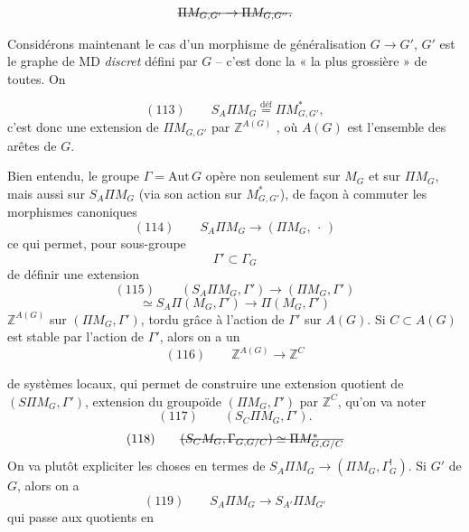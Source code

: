 \documentclass[11pt,a4paper]{article}
\begin{document}
   
\[
\text{\struck{$\Pi M_{G,G'} \to \Pi M_{G,G''}$.}}
\]

Considérons maintenant le cas d'un morphisme de généralisation $G \to G'$,  $G'$ est le graphe de MD \emph{discret} défini par $G$ -- c'est donc la   « la plus grossière » de toutes. On  


\[
(113)\qquad S_{A}\Pi M_{G} \overset{\mathrm{déf}}{=} \Pi M^{*}_{G,G'} ,
\]
\marginal{\struck{\ill{}} $= \surd$}
c'est donc une extension de $\Pi M_{G,G'}$ par $\mathbb{Z}^{A(G)}$ \struck{\ill{}}, où $A(G)$ est l'ensemble des arêtes de $G$.

Bien entendu, le groupe $\Gamma = \mathrm{Aut}\, G$ opère non seulement sur $M_{G}$ et sur $\Pi M_{G}$, mais aussi sur $S_{A}\Pi M_{G}$ \struck{\ill{}} (via son action sur $M^{*}_{G,G'}$), de façon à commuter  les morphismes canoniques
\[
(114)\qquad S_{A}\Pi M_{G} \longrightarrow (\Pi M_{G},\ \cdot\,)
\]
ce qui permet, pour   sous-groupe
\[
\Gamma' \subset \Gamma_{G}
\]
\struck{\ill{}} de définir une extension
\[
(115)\qquad (S_{A}\Pi M_{G},\Gamma') \longrightarrow (\Pi M_{G},\Gamma')
\]
\[
\simeq S_{A}\Pi(M_{G},\Gamma') \longrightarrow \Pi(M_{G},\Gamma')
\]
  $\mathbb{Z}^{A(G)}$ sur $(\Pi M_{G},\Gamma')$, tordu grâce à l'action de $\Gamma'$ sur $A(G)$. Si $C \subset A(G)$ est stable par l'action de $\Gamma'$, alors on a un 
\[
(116)\qquad \mathbb{Z}^{A(G)} \longrightarrow \mathbb{Z}^{C}
\]

de systèmes locaux, qui permet de construire une extension quotient de $(S\Pi M_{G},\Gamma')$, extension du groupoïde $(\Pi M_{G},\Gamma')$ par $\mathbb{Z}^{C}$, qu'on va noter
\[
(117)\qquad (S_{C}\Pi M_{G},\Gamma') .
\]
\[
(118)\qquad \text{\struck{$(S_{C}M_{G},\Gamma_{G,G/C}) \simeq \Pi M^{*}_{G,G/C}$}}
\]
On va plutôt expliciter les choses en termes de $S_{A}\Pi M_{G} \to (\Pi M_{G},\Gamma^{!}_{G})$. Si $G'$     de $G$, alors on a
\[
(119)\qquad S_{A}\Pi M_{G} \longrightarrow S_{A'}\Pi M_{G'}
\]
qui passe aux quotients en
\end{document}
